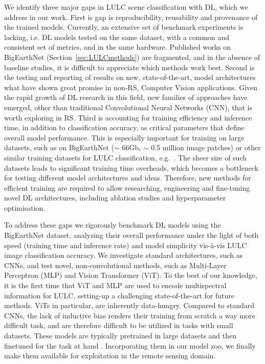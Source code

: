 \documentclass[journal]{IEEEtran}
\begin{document}
We identify three major gaps in LULC scene classification with DL, which we address in our work. 
First is gap is reproducibility, reusability and provenance of the trained models. Currently, an extensive set of benchmark experiments is lacking, i.e. DL models tested on the same dataset, with a common and consistent set of metrics, and in the same hardware. Published works on BigEarthNet (Section~\ref{sec:LULCmethods}) are fragmented, and in the absence of baseline studies, it is difficult to appreciate which methods work best.
Second is the testing and reporting of results on new, state-of-the-art, model architectures what have shown great promise in non-RS, Computer Vision applications. Given the rapid growth of DL research in this field, new families of approaches have emerged, other than traditional Convolutional Neural Networks (CNN), that is worth exploring in RS. 
Third is accounting for training efficiency and inference time, in addition to classification accuracy, as critical parameters that define overall model performance. This is especially important for training on large datasets, such as on BigEarthNet ($\sim$ 66Gb, $\sim$ 0.5 million image patches) or other similar training datasets for LULC classification, e.g.~\cite{hong2021multimodal, helber2019eurosat}. The sheer size of such datasets leads to significant training time overheads, which becomes a bottleneck for testing different model architectures and ideas. Therefore, new methods for efficient training are required to allow researching, engineering and fine-tuning novel DL architectures, including ablation studies and hyperparameter optimisation.




To address these gaps we rigorously benchmark DL models using the BigEarthNet dataset, analyzing their overall performance under the light of both speed (training time and inference rate) and model simplicity vis-à-vis LULC image classification accuracy. We investigate standard architectures, such as CNNs, and test novel, non-convolutional methods, such as Multi-Layer Perceptron (MLP) and Vision Transformer (ViT). To the best of our knowledge, it is the first time that ViT and MLP are used to encode multispectral information for LULC, setting-up a challenging state-of-the-art for future methods. ViTs in particular, are inherently data-hungry. Compared  to standard CNNs, the lack of inductive bias renders their training from scratch a way more difficult task, and are therefore difficult to be utilized in tasks with small datasets. These models are typically pretrained in large datasets and then finetuned for the task at hand \citep{DBLP:journals/corr/abs-2010-11929, steiner2021train}. Incorporating them in our model zoo, we finally make them available for exploitation in the remote sensing domain.
\end{document}

